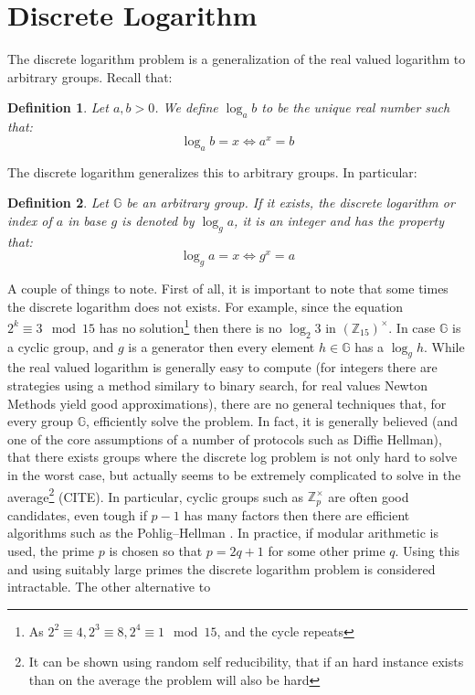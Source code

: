 \documentclass{article}
\newtheorem{definition}{Definition}
\begin{document}
\section{Discrete Logarithm}
The discrete logarithm problem is a generalization of the real valued logarithm to arbitrary groups. Recall that:
\begin{definition}
    Let $a, b > 0$. We define $\log_a b$ to be the unique real number  such that:
    \[ \log_a b = x \iff a^x = b \]
\end{definition}
The discrete logarithm generalizes this to arbitrary groups. In particular:
\begin{definition}
    Let $\mathbb{G}$ be an arbitrary group. If it exists, the discrete logarithm or index of $a$ in base $g$ is denoted
    by $\log_g a$, it is an integer and has the property that: 
    \[ \log_g a = x \iff g^x = a \]
\end{definition}
A couple of things to note. First of all, it is important to note that some times the discrete logarithm does not exists.
For example, since the equation $2^k \equiv 3 \mod 15$ has no solution\footnote{As $2^2 \equiv 4, 2^3 \equiv 8, 2^4 \equiv 1 \mod 15$, and the cycle repeats}
then there is no $\log_2 3$ in $(\mathbb{Z}_{15})^\times$. In case $\mathbb{G}$ is a cyclic group, and $g$ is a generator then 
every element $h \in \mathbb{G}$ has a $\log_g h$. While the real valued logarithm is generally easy to compute (for integers there 
are strategies using a method similary to binary search, for real values Newton Methods yield good approximations), there are no 
general techniques that, for every group $\mathbb{G}$, efficiently solve the problem. In fact, it is generally believed (and one 
of the core assumptions of a number of protocols such as Diffie Hellman), that there exists groups where the discrete log problem 
is not only hard to solve in the worst case, but actually seems to be extremely complicated to solve in the average\footnote{It can be shown
using random self reducibility, that if an hard instance exists than on the average the problem will also be hard} (CITE).
In particular, cyclic groups such as $\mathbb{Z}_p^\times$ are often good candidates, even tough if $p - 1$ has many factors 
then there are efficient algorithms such as the Pohlig–Hellman \cite{pohligImprovedAlgorithmComputing1978}. In practice, 
if modular arithmetic is used, the prime $p$ is chosen so that $p = 2q + 1$ for some other prime $q$. Using this and using
suitably large primes the discrete logarithm problem is considered intractable. The other alternative to 
\end{document}
